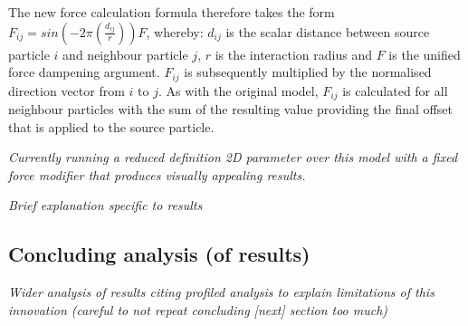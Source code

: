     The new force calculation formula therefore takes the form $F_{ij} = sin(-2\pi(\frac{d_{ij}}{r}))F$, whereby: $d_{ij}$ is the scalar distance between source particle $i$ and neighbour particle $j$, $r$ is the interaction radius and $F$ is the unified force dampening argument. $F_{ij}$ is subsequently multiplied by the normalised direction vector from $i$ to $j$. As with the original model, $F_{ij}$ is calculated for all neighbour particles with the sum of the resulting value providing the final offset that is applied to the source particle.
    
    \textit{Currently running a reduced definition 2D parameter over this model with a fixed force modifier that produces visually appealing results.}
    
    \textit{Brief explanation specific to results}

  \subsection{Concluding analysis (of results)}
    \textit{Wider analysis of results citing profiled analysis to explain limitations of this innovation (careful to not repeat concluding [next] section too much)}

